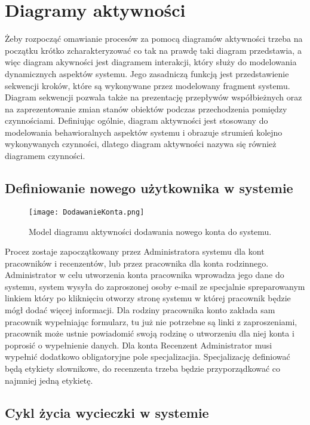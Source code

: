 \section{Diagramy aktywności}

Żeby rozpocząć omawianie procesów za pomocą diagramów aktywności trzeba na początku krótko zcharakteryzować co tak na prawdę taki diagram przedstawia, a więc diagram akywności jest diagramem interakcji, który służy do modelowania dynamicznych aspektów systemu. Jego zasadniczą funkcją jest przedstawienie sekwencji kroków, które są wykonywane przez modelowany fragment systemu. Diagram sekwencji pozwala także na prezentację przepływów współbieżnych oraz na zaprezentowanie zmian stanów obiektów podczas przechodzenia pomiędzy czynnościami.  Definiując ogólnie, diagram aktywności jest stosowany do modelowania behawioralnych aspektów systemu i obrazuje strumień kolejno wykonywanych czynności, dlatego diagram aktywności nazywa się również diagramem czynności.

\subsection{Definiowanie nowego użytkownika w systemie}

\begin{figure}[!h]
    \centering
    \texttt{[image: DodawanieKonta.png]}
    \caption{Model diagramu aktywności dodawania nowego konta do systemu.}
    \label{fig:dodawaniekonta}
\end{figure}

Procez zostaje zapoczątkowany przez Administratora systemu dla kont pracowników i recenzentów, lub przez pracownika dla konta rodzinnego. Administrator w celu utworzenia konta pracownika wprowadza jego dane do systemu, system wysyła do zaproszonej osoby e-mail ze specjalnie spreparowanym linkiem który po kliknięciu otworzy stronę systemu w której pracownik będzie mógł dodać więcej informacji.  Dla rodziny pracownika konto zakłada sam pracownik wypełniając formularz, tu już nie potrzebne są linki z zaproszeniami, pracownik może ustnie powiadomić swoją rodzinę o utworzeniu dla niej konta i poprosić o wypełnienie danych. Dla konta Recenzent Administrator musi wypełnić dodatkowo obligatoryjne pole specjalizacjia. Specjalizację definiować będą etykiety słownikowe, do recenzenta trzeba będzie przyporządkować co najmniej jedną etykietę.

\subsection{Cykl życia wycieczki w systemie}

